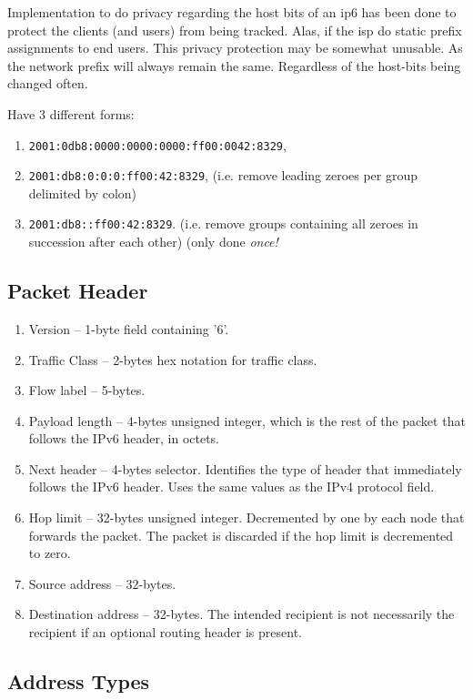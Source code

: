 Implementation to do privacy regarding the host bits of an \gls{ip6} has been done to protect the clients (and users) from being tracked. Alas, if the \gls{isp} do static prefix assignments to end users. This privacy protection may be somewhat unusable. As the network prefix will always remain the same. Regardless of the host-bits being changed often.

Have 3 different forms:
\begin{enumerate}
    \item \texttt{2001:0db8:0000:0000:0000:ff00:0042:8329},
    \item \texttt{2001:db8:0:0:0:ff00:42:8329}, {\footnotesize (i.e. remove leading zeroes per group delimited by colon)}
    \item \texttt{2001:db8::ff00:42:8329}. {\footnotesize (i.e. remove groups containing all zeroes in succession after each other) (only done \textit{once!}}
\end{enumerate}

\subsection{Packet Header}


\begin{enumerate}
    \item Version -- 1-byte field containing '6'.
    \item Traffic Class -- 2-bytes hex notation for traffic class.
    \item Flow label -- 5-bytes.
    \item Payload length -- 4-bytes unsigned integer, which is the rest of the packet that follows the IPv6 header, in octets.
    \item Next header -- 4-bytes selector. Identifies the type of header that immediately follows the IPv6 header. Uses the same values as the IPv4 protocol field.
    \item Hop limit -- 32-bytes unsigned integer. Decremented by one by each node that forwards the packet. The packet is discarded if the hop limit is decremented to zero.
    \item Source address -- 32-bytes.
    \item Destination address -- 32-bytes. The intended recipient is not necessarily the recipient if an optional routing header is present.
\end{enumerate}

\subsection{Address Types}

